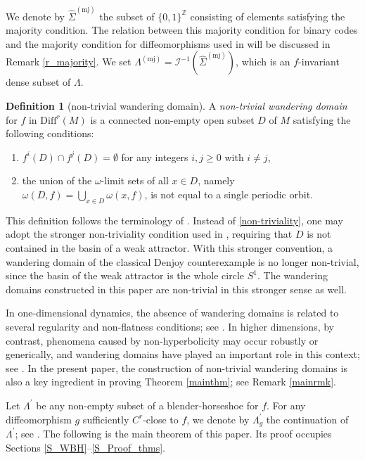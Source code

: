 \documentclass{amsart}
\theoremstyle{definition}
\newtheorem{dfn}[thm]{Definition}
\numberwithin{equation}{section}
\numberwithin{figure}{section}
\begin{document}
\noindent
We denote by $\widehat\Sigma^{(\mathrm{mj})}$ the subset of $\{0,1\}^{\mathbb{Z}}$ consisting of elements satisfying the majority condition. 
The relation between this majority condition for binary codes and the majority condition for diffeomorphisms used in \cite{KNS23} will be discussed in Remark \ref{r_majority}. 
We set $\Lambda^{(\mathrm{mj})}=\mathcal{I}^{-1}(\widehat\Sigma^{(\mathrm{mj})})$, which is an $f$-invariant dense subset of $\Lambda$.

\begin{dfn}[non-trivial wandering domain]
A \emph{non-trivial wandering domain} for $f$ in $\mathrm{Diff}^{r}(M)$ is a connected non-empty open subset $D$ of $M$ satisfying the following conditions: 
\begin{enumerate}[(1)]
\item $f^{i}(D)\cap f^{j}(D)=\emptyset$ for any integers $i,j\geq 0$ with $i\neq j$, 
\item \label{non-triviality} the union of the $\omega$-limit sets of all $x\in D$, namely $\omega(D,f)=\bigcup_{x\in D}\omega(x,f)$, is not equal to a single periodic orbit.
\end{enumerate}
\end{dfn}

\noindent 
This definition follows the terminology of \cite{dMvS}. 
Instead of \eqref{non-triviality}, one may adopt the stronger non-triviality condition used in \cite{CV01}, requiring that $D$ is not contained in the basin of a weak attractor. 
With this stronger convention, a wandering domain of the classical Denjoy counterexample is no longer non-trivial, since the basin of the weak attractor is the whole circle $S^{1}$. 
The wandering domains constructed in this paper are non-trivial in this stronger sense as well.

In one-dimensional dynamics, the absence of wandering domains is related to several regularity and non-flatness conditions; see \cite{vS10}. 
In higher dimensions, by contrast, phenomena caused by non-hyperbolicity may occur robustly or generically, and wandering domains have played an important role in this context; see \cite{CV01, KS17, B22, BB23}. 
In the present paper, the construction of non-trivial wandering domains is also a key ingredient in proving Theorem \ref{mainthm}; see Remark \ref{mainrmk}.

Let $\Lambda^{\prime}$ be any non-empty subset of a blender-horseshoe for $f$. 
For any diffeomorphism $g$ sufficiently $C^{r}$-close to $f$, we denote by $\Lambda^{\prime}_{g}$ the continuation of $\Lambda^{\prime}$; see \cite{BD12}. 
The following is the main theorem of this paper. 
Its proof occupies Sections \ref{S_WBH}--\ref{S_Proof_thms}.
\end{document}

